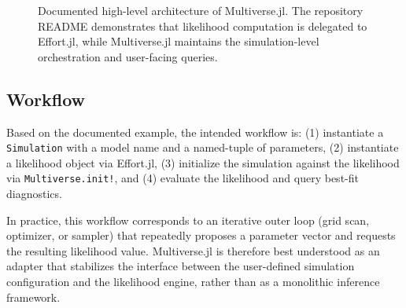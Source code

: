 \documentclass[11pt]{article}
\begin{document}
\begin{figure}[h]
  \centering
  \caption{Documented high-level architecture of Multiverse.jl. The repository README demonstrates that likelihood computation is delegated to Effort.jl, while Multiverse.jl maintains the simulation-level orchestration and user-facing queries.}
\end{figure}

\subsection{Workflow}
Based on the documented example, the intended workflow is:
(1) instantiate a \texttt{Simulation} with a model name and a named-tuple of parameters,
(2) instantiate a likelihood object via Effort.jl,
(3) initialize the simulation against the likelihood via \texttt{Multiverse.init!}, and
(4) evaluate the likelihood and query best-fit diagnostics.

In practice, this workflow corresponds to an iterative outer loop (grid scan, optimizer, or sampler) that repeatedly proposes a parameter vector and requests the resulting likelihood value.
Multiverse.jl is therefore best understood as an adapter that stabilizes the interface between the user-defined simulation configuration and the likelihood engine, rather than as a monolithic inference framework.
\end{document}
